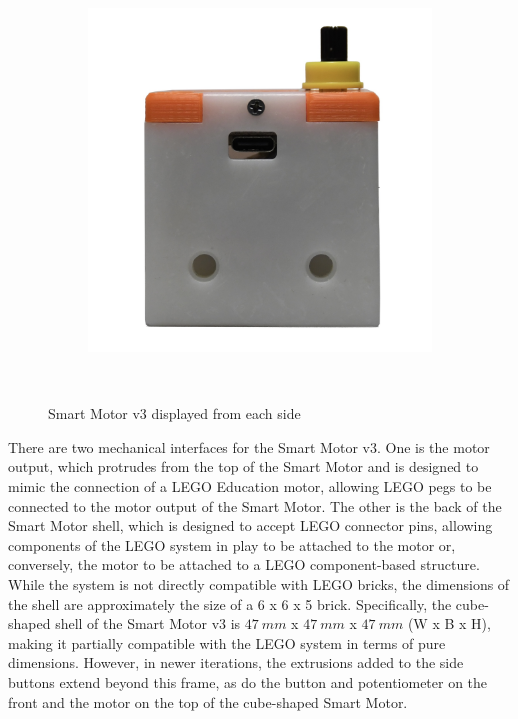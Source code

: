 \begin{figure}[H]
\begin{subfigure}[b]{0.25\textwidth}
    \end{subfigure}
    \begin{subfigure}[b]{0.25\textwidth}
        \includegraphics[width=\linewidth]{overleaf/images/sm_bottom.jpg}
    \end{subfigure}
    \\\vspace{\ftspace}
    \caption{Smart Motor v3 displayed from each side}
    \label{fig:smv3_hardware}
\end{figure}

There are two mechanical interfaces for the Smart Motor v3. One is the motor output, which protrudes from the top of the Smart Motor and is designed to mimic the connection of a LEGO Education motor, allowing LEGO pegs to be connected to the motor output of the Smart Motor. The other is the back of the Smart Motor shell, which is designed to accept LEGO connector pins, allowing components of the LEGO system in play to be attached to the motor or, conversely, the motor to be attached to a LEGO component-based structure. While the system is not directly compatible with LEGO bricks, the dimensions of the shell are approximately the size of a 6 x 6 x 5 brick. Specifically, the cube-shaped shell of the Smart Motor v3 is $47\ mm$ x $47\ mm$ x $47\ mm$ (W x B x H), making it partially compatible with the LEGO system in terms of pure dimensions. However, in newer iterations, the extrusions added to the side buttons extend beyond this frame, as do the button and potentiometer on the front and the motor on the top of the cube-shaped Smart Motor.

